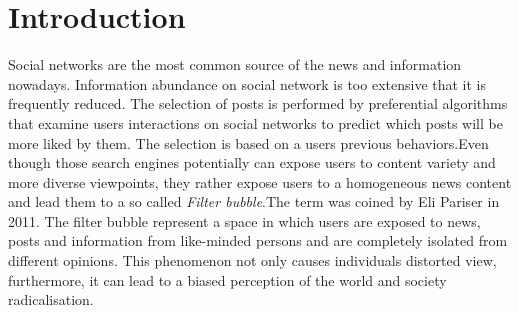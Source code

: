 
\newpage
\section*{Introduction}

\noindent Social networks are the most common source of the news and information nowadays. Information abundance on social network is too extensive that it is frequently reduced. The selection of posts is performed by preferential algorithms that examine users interactions on social networks to predict which posts will be more liked by them. The selection is based on a users previous behaviors.Even though those search engines potentially can expose users to content variety and more diverse viewpoints, they rather expose users to a homogeneous  news content and lead them to a so called \textit{Filter bubble}.The term was coined by Eli Pariser in 2011. The filter bubble represent a space in which users are exposed to news, posts and information from like-minded persons and are completely isolated from different opinions. This phenomenon not only causes individuals distorted view, furthermore, it can lead to a biased perception of the world and society radicalisation.
 


